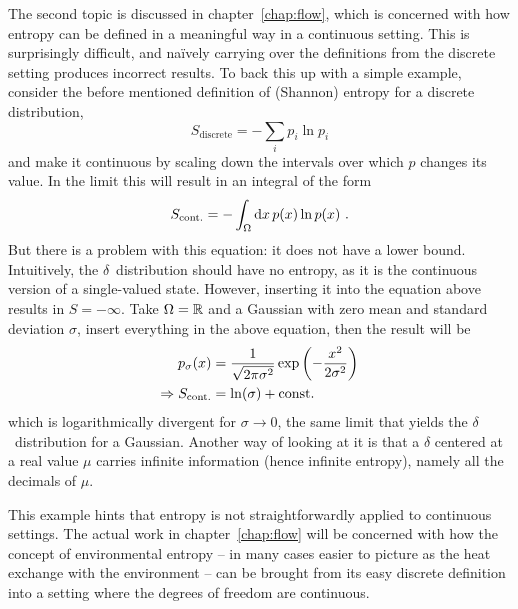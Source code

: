 The second topic is discussed in chapter~\ref{chap:flow}, which is concerned with how entropy can be defined in a meaningful way in a continuous setting. This is surprisingly difficult, and na\"ively carrying over the definitions from the discrete setting produces incorrect results. To back this up with a simple example, consider the before mentioned definition of (Shannon) entropy for a discrete distribution,
%
\begin{equation}
	S_\text{discrete} = -\sum_ip_i\ln p_i
\end{equation}
%
and make it continuous by scaling down the intervals over which \(p\) changes its value. In the limit this will result in an integral of the form
%
\begin{equation}
	S_\text{cont.} = -\int_\Omega\mathrm{d} x\,p(x)\ln p(x) ~.
\end{equation}
%
But there is a problem with this equation: it does not have a lower bound. Intuitively, the \(\delta\)~distribution should have no entropy, as it is the continuous version of a single-valued state. However, inserting it into the equation above results in \(S = -\infty\). Take \(\Omega = \mathbb{R}\) and a Gaussian with zero mean and standard deviation \(\sigma\), insert everything in the above equation, then the result will be
%
\begin{align}
	p_\sigma(x) &= \frac1{\sqrt{2\pi\sigma^2}} \operatorname{exp}\left(-\frac{x^2}{2\sigma^2}\right) \\
	\Rightarrow S_\text{cont.} &= \ln(\sigma) + \mathrm{const.}
\end{align}
%
which is logarithmically divergent for \(\sigma\to0\), the same limit that yields the \(\delta\)~distribution for a Gaussian. Another way of looking at it is that a \(\delta\) centered at a real value \(\mu\) carries infinite information (hence infinite entropy), namely all the decimals of \(\mu\).

This example hints that entropy is not straightforwardly applied to continuous settings. The actual work in chapter~\ref{chap:flow} will be concerned with how the concept of environmental entropy -- in many cases easier to picture as the heat exchange with the environment -- can be brought from its easy discrete definition into a setting where the degrees of freedom are continuous.




